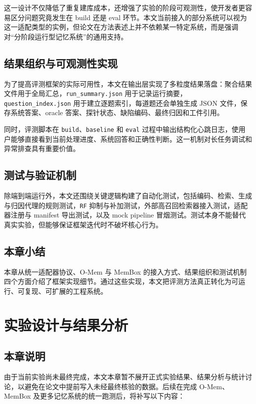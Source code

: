 这一设计不仅降低了重复建库成本，还增强了实验的阶段可观测性，使开发者更容易区分问题究竟发生在 build 还是 eval 环节。本文当前接入的部分系统可以视为这一适配类型的实例，但论文在方法表述上并不依赖某一特定系统，而是强调对“分阶段运行型记忆系统”的通用支持。

\section{结果组织与可观测性实现}

为了提高评测框架的实际可用性，本文在输出层实现了多粒度结果落盘：聚合结果文件用于全局汇总，\texttt{run\_summary.json} 用于记录运行摘要，\texttt{question\_index.json} 用于建立逐题索引，每道题还会单独生成 JSON 文件，保存系统答案、oracle 答案、探针状态、缺陷编码、最终归因和工件引用。

同时，评测脚本在 \texttt{build}、\texttt{baseline} 和 \texttt{eval} 过程中输出结构化心跳日志，使用户能够直接看到当前处理进度、系统回答和正确性判断。这一机制对长任务调试和异常排查具有重要价值。

\section{测试与验证机制}

除端到端运行外，本文还围绕关键逻辑构建了自动化测试，包括编码、检索、生成与归因代理的规则测试，\texttt{RF} 抑制与补加测试，外部高召回检索器接入测试，适配器注册与 manifest 导出测试，以及 mock pipeline 冒烟测试。测试本身不能替代真实实验，但能够保证框架迭代时不破坏核心行为。

\section{本章小结}

本章从统一适配器协议、O-Mem 与 MemBox 的接入方式、结果组织和测试机制四个方面介绍了框架实现细节。通过这些实现，本文把评测方法真正转化为可运行、可复现、可扩展的工程系统。

\chapter{实验设计与结果分析}

\section{本章说明}

由于当前实验尚未最终完成，本文本章暂不展开正式实验结果、结果分析与统计讨论，以避免在论文中提前写入未经最终核验的数据。后续在完成 O-Mem、MemBox 及更多记忆系统的统一跑测后，将补写以下内容：

